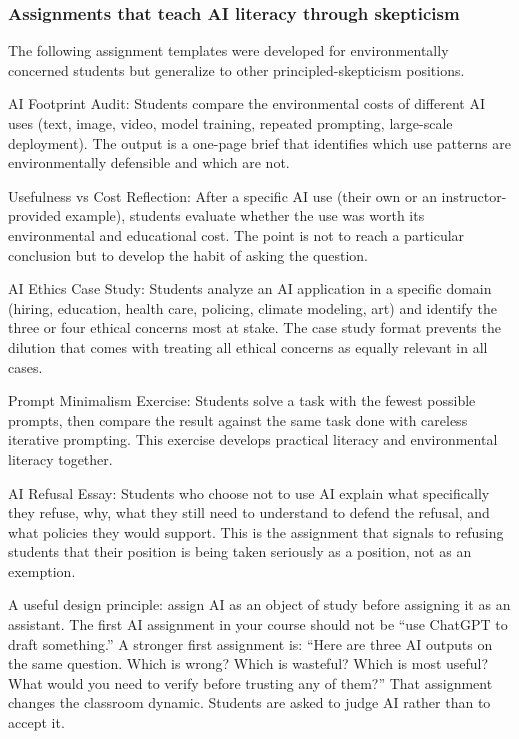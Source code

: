 \documentclass[12pt]{article}
\begin{document}
\subsubsection*{Assignments that teach AI literacy through skepticism}

The following assignment templates were developed for environmentally concerned students but generalize to other principled-skepticism positions.

AI Footprint Audit: Students compare the environmental costs of different AI uses (text, image, video, model training, repeated prompting, large-scale deployment). The output is a one-page brief that identifies which use patterns are environmentally defensible and which are not.

Usefulness vs Cost Reflection: After a specific AI use (their own or an instructor-provided example), students evaluate whether the use was worth its environmental and educational cost. The point is not to reach a particular conclusion but to develop the habit of asking the question.

AI Ethics Case Study: Students analyze an AI application in a specific domain (hiring, education, health care, policing, climate modeling, art) and identify the three or four ethical concerns most at stake. The case study format prevents the dilution that comes with treating all ethical concerns as equally relevant in all cases.

Prompt Minimalism Exercise: Students solve a task with the fewest possible prompts, then compare the result against the same task done with careless iterative prompting. This exercise develops practical literacy and environmental literacy together.

AI Refusal Essay: Students who choose not to use AI explain what specifically they refuse, why, what they still need to understand to defend the refusal, and what policies they would support. This is the assignment that signals to refusing students that their position is being taken seriously as a position, not as an exemption.

A useful design principle: assign AI as an object of study before assigning it as an assistant. The first AI assignment in your course should not be ``use ChatGPT to draft something.'' A stronger first assignment is: ``Here are three AI outputs on the same question. Which is wrong? Which is wasteful? Which is most useful? What would you need to verify before trusting any of them?'' That assignment changes the classroom dynamic. Students are asked to judge AI rather than to accept it.
\end{document}
